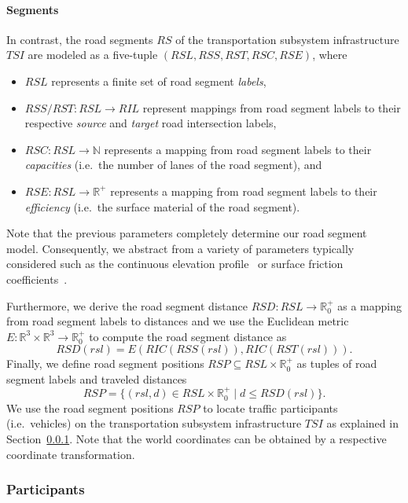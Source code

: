 \paragraph{Segments}
\label{segments}

In contrast, the road segments $RS$ of the transportation subsystem infrastructure $TSI$ are modeled as a five-tuple $(RSL, RSS, RST, RSC, RSE)$, where
\begin{itemize}
	\item $RSL$ represents a finite set of road segment \textit{labels},
	\item $RSS/RST: RSL \rightarrow RIL$ represent mappings from road segment labels to their respective \textit{source} and \textit{target} road intersection labels,
	\item $RSC: RSL \rightarrow \mathbb{N}$ represents a mapping from road segment labels to their \textit{capacities} (i.e.\ the number of lanes of the road segment), and
	\item $RSE: RSL \rightarrow \mathbb{R}^+$ represents a mapping from road segment labels to their \textit{efficiency} (i.e.\ the surface material of the road segment).
\end{itemize}
Note that the previous parameters completely determine our road segment model. Consequently, we abstract from a variety of parameters typically considered such as the continuous elevation profile~\cite{?} or surface friction coefficients~\cite{?}.

Furthermore, we derive the road segment distance $RSD: RSL \rightarrow \mathbb{R}_0^+$ as a mapping from road segment labels to distances and we use the Euclidean metric $E: \mathbb{R}^3 \times \mathbb{R}^3 \rightarrow \mathbb{R}_0^+$ to compute the road segment distance as
\[
	RSD(rsl) = E(RIC(RSS(rsl)), RIC(RST(rsl))) \textrm{.}
\]
Finally, we define road segment positions $RSP \subseteq RSL \times \mathbb{R}_0^+$ as tuples of road segment labels and traveled distances
\[
	RSP = \{(rsl, d) \in RSL \times \mathbb{R}_0^+ \mid d \leq RSD(rsl)\} \textrm{.}
\]
We use the road segment positions $RSP$ to locate traffic participants (i.e.\ vehicles) on the transportation subsystem infrastructure $TSI$ as explained in Section~\ref{participants}. Note that the world coordinates can be obtained by a respective coordinate transformation.

\subsubsection{Participants}
\label{participants}

